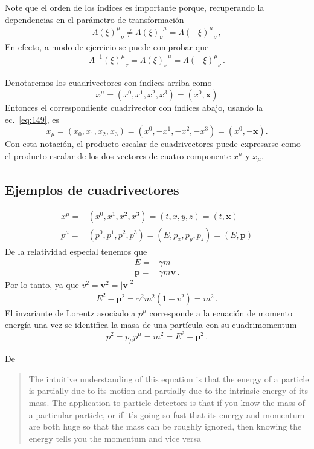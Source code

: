 Note que el orden de los índices es importante porque, recuperando la dependencias en el parámetro de transformación
\begin{align}
  {\Lambda(\xi)^{\mu}}_{\nu}\ne {\Lambda(\xi)_{\nu}}^{\mu}={\Lambda(-\xi)^{\mu}}_{\nu}\,,
\end{align}
En efecto, a modo de ejercicio se puede comprobar que
\begin{align}
{\Lambda^{-1}(\xi)^{\mu}}_{\nu} ={\Lambda(\xi)_{\nu}}^{\mu}= {\Lambda(-\xi)^{\mu}}_{\nu}\,.
\end{align}


\begin{frame}
Denotaremos los cuadrivectores con índices arriba como
\begin{equation}
  \label{eq:upindx}
  x^\mu=(x^0,x^1,x^2,x^3)=(x^0,\mathbf{x})
\end{equation}
Entonces el correspondiente cuadrivector con índices abajo, usando la ec.~\eqref{eq:149}, es
\begin{equation}
  x_\mu=(x_0,x_1,x_2,x_3)=(x^0,-x^1,-x^2,-x^3)=(x^0,-\mathbf{x}).
\end{equation}
Con esta notación, el producto escalar de cuadrivectores puede expresarse como el producto escalar de los dos vectores de cuatro componente $x^\mu$ y $x_\mu$.
\subsection{Ejemplos de cuadrivectores}
\begin{align}
    x^\mu=&(x^0,x^1,x^2,x^3)=(t,x,y,z)=(t,\mathbf{x})\\
  p^\mu=&(p^0,p^1,p^2,p^3)=(E,p_x,p_y,p_z)=(E,\mathbf{p})
\end{align}
De la relatividad especial tenemos que
\begin{align}
  E=&\gamma m \nonumber\\
  \mathbf{p}=&\gamma m\mathbf{v}\,.
\end{align}
Por lo tanto, ya que $v^2=\mathbf{v}^2=|\mathbf{v}|^2$
\begin{align}
  E^2-\mathbf{p}^2=\gamma^2m^2(1-v^2)=m^2\,.
\end{align}
El invariante de Lorentz asociado a $p^\mu$ corresponde a la ecuación de momento energía una vez se identifica la masa de una partícula con su cuadrimomentum
\begin{equation}
  p^2=p_\mu p^\mu=m^2=E^2-\mathbf{p}^2\,.
\end{equation}
\end{frame}
De \cite{uslhcblog}
\begin{quote}
  The intuitive understanding of this equation is that the energy of a particle is partially due to its motion and partially due to the intrinsic energy of its mass.  The application to particle detectors is that if you know the mass of a particular particle, or if it’s going so fast that its energy and momentum are both huge so that the mass can be roughly ignored, then knowing the energy tells you the momentum and vice versa
\end{quote}

